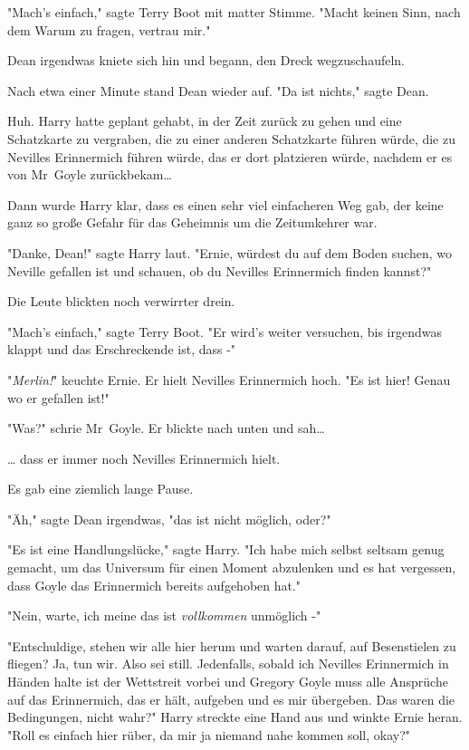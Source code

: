 {"Mach's einfach," sagte Terry Boot mit matter Stimme. "Macht keinen Sinn, nach dem Warum zu fragen, vertrau mir."

Dean irgendwas kniete sich hin und begann, den Dreck wegzuschaufeln.

Nach etwa einer Minute stand Dean wieder auf. "Da ist nichts," sagte Dean.

Huh. Harry hatte geplant gehabt, in der Zeit zurück zu gehen und eine Schatzkarte zu vergraben, die zu einer anderen Schatzkarte führen würde, die zu Nevilles Erinnermich führen würde, das er dort platzieren würde, nachdem er es von Mr~Goyle zurückbekam…

Dann wurde Harry klar, dass es einen sehr viel einfacheren Weg gab, der keine ganz so große Gefahr für das Geheimnis um die Zeitumkehrer war.

"Danke, Dean!" sagte Harry laut. "Ernie, würdest du auf dem Boden suchen, wo Neville gefallen ist und schauen, ob du Nevilles Erinnermich finden kannst?"

Die Leute blickten noch verwirrter drein.

"Mach's einfach," sagte Terry Boot. "Er wird's weiter versuchen, bis irgendwas klappt und das Erschreckende ist, dass -"

"\emph{Merlin!}" keuchte Ernie. Er hielt Nevilles Erinnermich hoch. "Es ist hier! Genau wo er gefallen ist!"

"Was?" schrie Mr~Goyle. Er blickte nach unten und sah…

… dass er immer noch Nevilles Erinnermich hielt.

Es gab eine ziemlich lange Pause.

"Äh," sagte Dean irgendwas, "das ist nicht möglich, oder?"

"Es ist eine Handlungslücke," sagte Harry. "Ich habe mich selbst seltsam genug gemacht, um das Universum für einen Moment abzulenken und es hat vergessen, dass Goyle das Erinnermich bereits aufgehoben hat."

"Nein, warte, ich meine das ist \emph{vollkommen} unmöglich -"

"Entschuldige, stehen wir alle hier herum und warten darauf, auf Besenstielen zu fliegen? Ja, tun wir. Also sei still. Jedenfalls, sobald ich Nevilles Erinnermich in Händen halte ist der Wettstreit vorbei und Gregory Goyle muss alle Ansprüche auf das Erinnermich, das er hält, aufgeben und es mir übergeben. Das waren die Bedingungen, nicht wahr?" Harry streckte eine Hand aus und winkte Ernie heran. "Roll es einfach hier rüber, da mir ja niemand nahe kommen soll, okay?"

}
